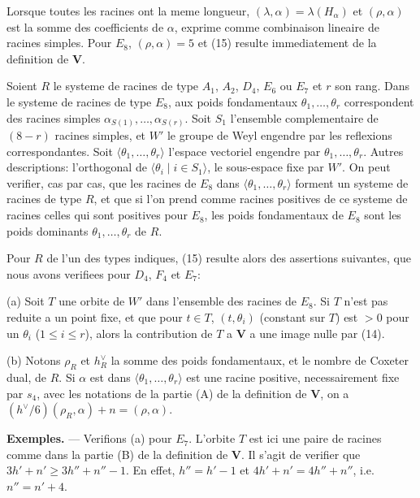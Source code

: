 \documentclass[11pt,a4paper]{article}
\theoremstyle{plain}
\theoremstyle{definition}
\begin{document}
Lorsque toutes les racines ont la meme longueur, $(\lambda, \alpha) = \lambda(H_\alpha)$ et $(\rho,\alpha)$ est la somme des coefficients de $\alpha$, exprime comme combinaison lineaire de racines simples. Pour $E_8$, $(\rho,\alpha) = 5$ et (15) resulte immediatement de la definition de $\mathbf{V}$.

Soient $R$ le systeme de racines de type $A_1$, $A_2$, $D_4$, $E_6$ ou $E_7$ et $r$ son rang. Dans le systeme de racines de type $E_8$, aux poids fondamentaux $\theta_1,\dots,\theta_r$ correspondent des racines simples $\alpha_{S(1)},\dots,\alpha_{S(r)}$. Soit $S_1$ l'ensemble complementaire de $(8-r)$ racines simples, et $W'$ le groupe de Weyl engendre par les reflexions correspondantes. Soit $\langle \theta_1,\dots,\theta_r \rangle$ l'espace vectoriel engendre par $\theta_1,\dots,\theta_r$. Autres descriptions: l'orthogonal de $\langle \theta_i \mid i \in S_1 \rangle$, le sous-espace fixe par $W'$. On peut verifier, cas par cas, que les racines de $E_8$ dans $\langle \theta_1,\dots,\theta_r \rangle$ forment un systeme de racines de type $R$, et que si l'on prend comme racines positives de ce systeme de racines celles qui sont positives pour $E_8$, les poids fondamentaux de $E_8$ sont les poids dominants $\theta_1,\dots,\theta_r$ de $R$.

Pour $R$ de l'un des types indiques, (15) resulte alors des assertions suivantes, que nous avons verifiees pour $D_4$, $F_4$ et $E_7$:

(a) Soit $T$ une orbite de $W'$ dans l'ensemble des racines de $E_8$. Si $T$ n'est pas reduite a un point fixe, et que pour $t \in T$, $(t,\theta_i)$ (constant sur $T$) est $> 0$ pour un $\theta_i$ ($1 \leq i \leq r$), alors la contribution de $T$ a $\mathbf{V}$ a une image nulle par (14).

(b) Notons $\rho_R$ et $h_R^\vee$ la somme des poids fondamentaux, et le nombre de Coxeter dual, de $R$. Si $\alpha$ est dans $\langle \theta_1,\dots,\theta_r \rangle$ est une racine positive, necessairement fixe par $s_4$, avec les notations de la partie (A) de la definition de $\mathbf{V}$, on a $(h^\vee/6)(\rho_R,\alpha) + n = (\rho,\alpha)$.

\smallskip

\textbf{Exemples.} --- Verifions (a) pour $E_7$. L'orbite $T$ est ici une paire de racines comme dans la partie (B) de la definition de $\mathbf{V}$. Il s'agit de verifier que $3h' + n' \geq 3h'' + n'' - 1$. En effet, $h'' = h' - 1$ et $4h' + n' = 4h'' + n''$, i.e.\ $n'' = n' + 4$.
\end{document}
